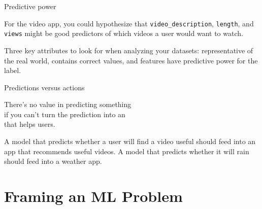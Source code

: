 \begin{frame}{Predictive power}
  \begin{withmargin}
    \begin{tdmargin}
      For the video app, you could hypothesize that \texttt{video\_description},
      \texttt{length}, and \texttt{views} might be good predictors of which
      videos a user would want to watch.
      \par\medskip
      Three key attributes to look for when analyzing your datasets:
      representative of the real world, contains correct values, and features
      have predictive power for the label.
    \end{tdmargin}
  \end{withmargin}
\end{frame}

\begin{frame}{Predictions versus actions}
  \vfill
  \begin{takeaway}
    There's no value in predicting something\\
    if you can't turn the prediction into an \\
    that helps users.
  \end{takeaway}
  \vfill
  {\small A model that predicts whether a user will find a video useful should
  feed into an app that recommends useful videos. A model that predicts whether
  it will rain should feed into a weather app.}
\end{frame}

\section[ML framing]{Framing an ML Problem}

